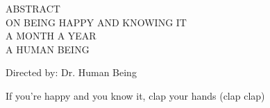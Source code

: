 
\begin{center}
    {ABSTRACT}\\[2em]
    
\MakeUppercase{On being happy and knowing it\\[1em]


A Month A YEAR\\[1em]

A HUMAN BEING \\[1em]
}

Directed by: Dr. Human Being\\[0.5in]

\end{center}


If you're happy and you know it, clap your hands (clap clap)


